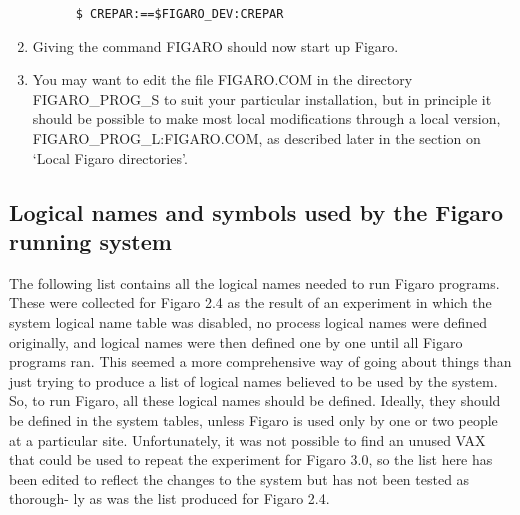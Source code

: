 \begin{enumerate}
\begin{verbatim}
      $ CREPAR:==$FIGARO_DEV:CREPAR
\end{verbatim}

\item Giving the command FIGARO should now start up Figaro.

\item You may want to edit the file  FIGARO.COM  in  the  directory
FIGARO\_PROG\_S  to  suit  your particular installation, but in principle  it
should  be  possible  to make most local modifications through a local
version, FIGARO\_PROG\_L:FIGARO.COM, as described later in  the  section on
`Local Figaro directories'.

\end{enumerate}
\subsection{Logical names and symbols used by the Figaro running system}

The following list contains all the logical names needed  to  run Figaro
programs.  These were collected for Figaro 2.4 as the result of an experiment
in which the system logical name table was disabled,  no process  logical names
were defined originally, and logical names were then defined one by one until
all Figaro programs ran.  This seemed  a more  comprehensive  way  of  going
about  things than just trying to produce a list of logical names believed to
be  used  by  the  system. So,  to  run  Figaro,  all  these  logical  names
should  be defined. Ideally, they should be defined in the system tables,
unless Figaro is used  only  by one or two people at a particular site.
Unfortunately, it was not possible to find an unused VAX that could be used to
repeat the  experiment  for  Figaro  3.0, so the list here has been edited to
reflect the changes to the system but has not been tested as thorough- ly as
was the list produced for Figaro 2.4.

